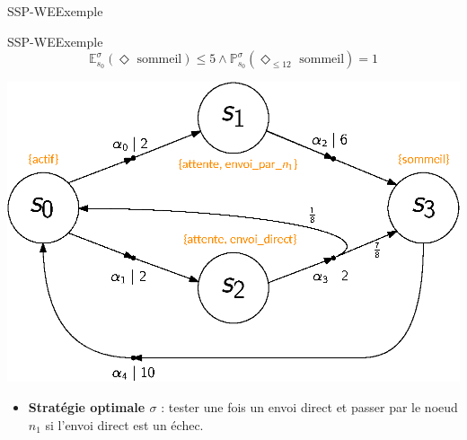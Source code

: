 \documentclass[compress]{beamer}
\theoremstyle{theorem}%
\begin{document}
\begin{frame}{SSP-WE}{Exemple}
\end{frame}

\begin{frame}{SSP-WE}{Exemple}
    \vspace{-0.05\linewidth}
    \[ \mathbb{E}^{\sigma}_{s_0}(\Diamond \text{ sommeil}) \leq 5 \wedge \mathbb{P}^\sigma_{s_0}(\Diamond_{\leq 12} \text{ sommeil}) = 1 \]
    \begin{center}
      \includegraphics[width=0.6\linewidth]{resources/main-mdp3}
    \end{center}
    \vspace{-0.05\linewidth}
    \begin{itemize}
      \item \textbf{\color{fibeamer@orange}Stratégie optimale $\sigma$} : tester une fois un envoi direct et passer par le noeud $n_1$ si l'envoi direct est un échec.
    \end{itemize}
\end{frame}
\end{document}
